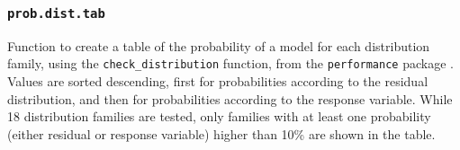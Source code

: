 \documentclass[
  bookmarksnumbered]{article}
\begin{document}
\hypertarget{prob.dist.tab}{%
\subsubsection{\texorpdfstring{\texttt{prob.dist.tab}}{prob.dist.tab}}\label{prob.dist.tab}}

Function to create a table of the probability of a model for each distribution family, using the \texttt{check\_distribution} function, from the \texttt{performance} package \autocite{ludecke2021}. Values are sorted descending, first for probabilities according to the residual distribution, and then for probabilities according to the response variable. While 18 distribution families are tested, only families with at least one probability (either residual or response variable) higher than 10\% are shown in the table.
\end{document}
